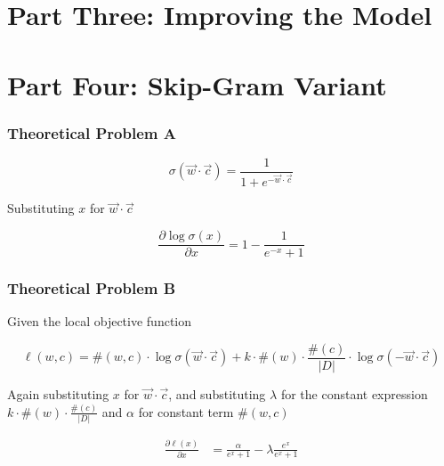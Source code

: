 


\chapter*{Part Three: Improving the Model}

\chapter*{Part Four: Skip-Gram Variant}




\subsection*{Theoretical Problem A}
\begin{equation*}
    \sigma(\vec{w} \cdot \vec{c})=\frac{1}{1+e^{-\vec{w} \cdot \vec{c}}}
\end{equation*}

Substituting $x$ for $\vec{w} \cdot \vec{c}$

\begin{equation*}
    \frac{\partial \log \sigma(x)}{\partial x} = 1 - \frac{1}{e^{-x}+1}
\end{equation*}

\subsection*{Theoretical Problem B}

Given the local objective function

\begin{equation*}
    \ell(w, c)=\#(w, c) \cdot \log \sigma(\vec{w} \cdot \vec{c})+k \cdot \#(w) \cdot \frac{\#(c)}{|D|} \cdot \log \sigma(-\vec{w} \cdot \vec{c})
\end{equation*}

Again substituting $x$ for $\vec{w} \cdot \vec{c}$, and substituting $\lambda$ for the constant expression $k \cdot \#(w) \cdot \frac{\#(c)}{|D|}$ and $\alpha$ for constant term $\#(w,c)$

\begin{align*}
    \frac{\partial \ell(x)}{\partial x} & = \frac{\alpha}{e^x + 1} -\lambda \frac{e^x}{e^x + 1}
\end{align*}


